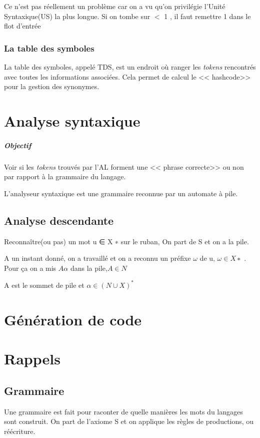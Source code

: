 \documentclass[12pt,a4paper,openany]{book}
\newcommand{\tokens}{\textit{tokens} }
\begin{document}
	Ce n'est pas réellement un problème car on a vu qu'on privilégie l'Unité Syntaxique(US) la plus longue.
	Si on tombe sur $<$ 1 , il faut remettre 1 dans le flot d’entrée

	\subsection{La table des symboles}
	La table des symboles, appelé TDS, est un endroit où ranger les \tokens rencontrés avec toutes les informations associées. Cela permet de calcul le <<
	hashcode>> pour la gestion des synonymes.

	\chapter{Analyse syntaxique}
	\paragraph{Objectif} Voir si les \tokens trouvés par l'AL forment une << phrase correcte>> ou non par rapport à la grammaire du langage.

	L'analyseur syntaxique est une grammaire reconnue par un automate à pile.

	\section{Analyse descendante}
Reconnaître(ou pas) un mot u ∈ X ∗ sur le ruban, On part de S et on a la pile.

A un instant donné, on a travaillé et on a reconnu un préfixe $\omega$ de u, $\omega \in X∗$ .
Pour ça on a mis $A\alpha$ dans la pile,$ A \in N$

A est le sommet de pile et $\alpha \in (N \cup X)^*$
	\chapter{Génération de code}

	\appendix
	\chapter{Rappels}
	\section{Grammaire}
	Une grammaire est fait pour raconter de quelle manières les mots du langages sont construit. On part de l'axiome S et on applique les règles de
	productions, ou réécriture.
\end{document}
